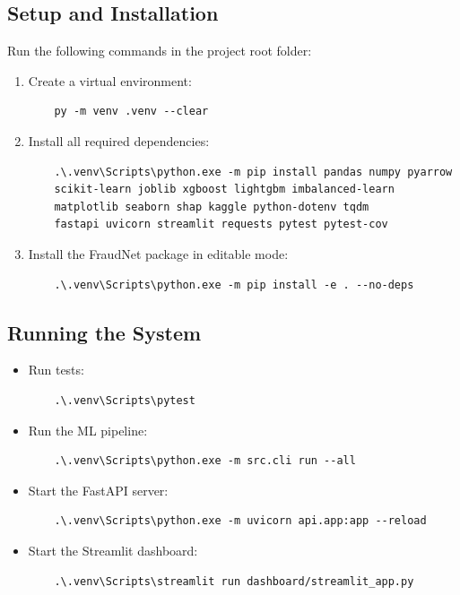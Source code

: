 \subsection{Setup and Installation}
Run the following commands in the project root folder:
\begin{enumerate}
    \item Create a virtual environment:
    \begin{verbatim}
    py -m venv .venv --clear
    \end{verbatim}
    \item Install all required dependencies:
    \begin{verbatim}
    .\.venv\Scripts\python.exe -m pip install pandas numpy pyarrow 
    scikit-learn joblib xgboost lightgbm imbalanced-learn 
    matplotlib seaborn shap kaggle python-dotenv tqdm 
    fastapi uvicorn streamlit requests pytest pytest-cov
    \end{verbatim}
    \item Install the FraudNet package in editable mode:
    \begin{verbatim}
    .\.venv\Scripts\python.exe -m pip install -e . --no-deps
    \end{verbatim}
\end{enumerate}

\subsection{Running the System}
\begin{itemize}
    \item Run tests:
    \begin{verbatim}
    .\.venv\Scripts\pytest
    \end{verbatim}
    \item Run the ML pipeline:
    \begin{verbatim}
    .\.venv\Scripts\python.exe -m src.cli run --all
    \end{verbatim}
    \item Start the FastAPI server:
    \begin{verbatim}
    .\.venv\Scripts\python.exe -m uvicorn api.app:app --reload
    \end{verbatim}
    \item Start the Streamlit dashboard:
    \begin{verbatim}
    .\.venv\Scripts\streamlit run dashboard/streamlit_app.py
    \end{verbatim}
\end{itemize}

